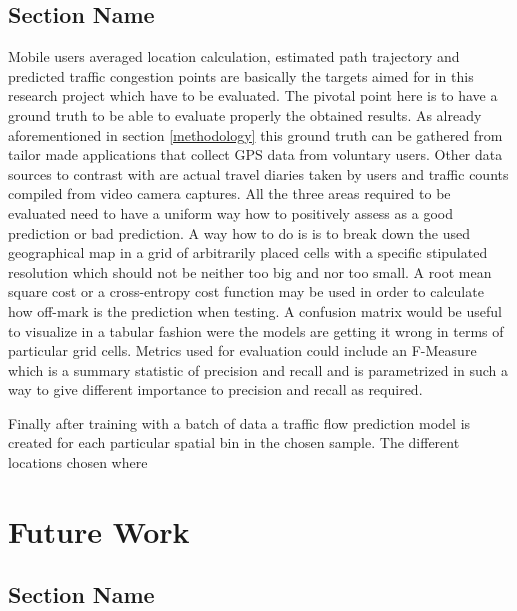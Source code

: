\documentclass[12pt, a4paper]{report}
\theoremstyle{definition}
\theoremstyle{definition}%
\theoremstyle{definition}%
\theoremstyle{definition}%
\theoremstyle{definition}%
\theoremstyle{definition}%
\begin{document}
\section{Section Name}
Mobile users averaged location calculation, estimated path trajectory and predicted traffic congestion points are basically the targets aimed for in this research project which have to be evaluated. The pivotal point here is to have a ground truth to be able to evaluate properly the obtained results. As already aforementioned in section \ref{methodology} this ground truth can be gathered from tailor made applications that collect GPS data from voluntary users. Other data sources to contrast with are actual travel diaries taken by users and traffic counts compiled from video camera captures.
All the three areas required to be evaluated need to have a uniform way how to positively assess as a good prediction or bad prediction. A way how to do is is to break down the used geographical map in a grid of arbitrarily placed cells with a specific stipulated resolution which should not be neither too big and nor too small. A root mean square cost or a cross-entropy cost function may be used in order to calculate how off-mark is the prediction when testing. A confusion matrix would be useful to visualize in a tabular fashion were the models are getting it wrong in terms of particular grid cells. Metrics used for evaluation could include an F-Measure which is a summary statistic of precision and recall and is parametrized in such a way to give different importance to precision and recall as required.

Finally after training with a batch of data a traffic flow prediction model is created for each particular spatial bin in the chosen sample. The different locations chosen where


\chapter{Future Work} \label{chapter:future_work}
\section{Section Name}

\end{document}
